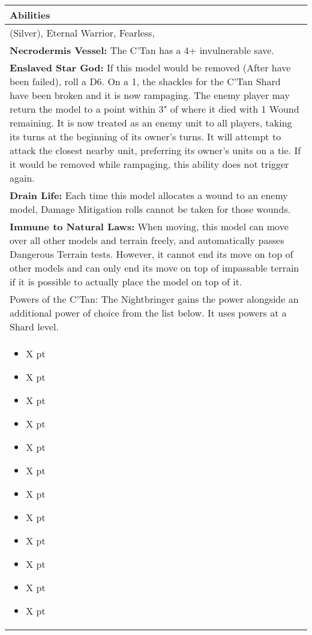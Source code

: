 \noindent
\begin{tabular}{||m{532pt}||}
	\hline
	Abilities \\
	\hline
	\quickref{Awakening Protocols} (Silver), Eternal Warrior, Fearless, \quickref{Reanimation Protocols} \\
	\textbf{Necrodermis Vessel:} The C'Tan has a 4+ invulnerable save. \\
	\textbf{Enslaved Star God:} If this model would be removed (After \quickref{Reanimation Protocols} have been failed), roll a D6. On a 1, the shackles for the C'Tan Shard have been broken and it is now rampaging. The enemy player may return the model to a point within 3" of where it died with 1 Wound remaining. It is now treated as an enemy unit to all players, taking its turns at the beginning of its owner's turns. It will attempt to attack the closest nearby unit, preferring its owner's units on a tie. If it would be removed while rampaging, this ability does not trigger again. \\
	\textbf{Drain Life:} Each time this model allocates a wound to an enemy model, Damage Mitigation rolls cannot be taken for those wounds. \\
	\textbf{Immune to Natural Laws:} When moving, this model can move over all other models and terrain 	freely, and automatically passes Dangerous Terrain tests. However, it cannot end its move on top of other models and can only end its move on top of impassable terrain if it is possible to actually place the model on top of it. \\
	Powers of the C'Tan: The Nightbringer gains the \quickref{Gaze of Death} power alongside an additional power of choice from the list below. It uses powers at a Shard level. \\
	\begin{itemize}
		\item \quickref{Antimatter Meteor} \hrulefill X pt
		\item \quickref{Cosmic Fire} \hrulefill X pt
		\item \quickref{Entropic Touch} \hrulefill X pt
		\item \quickref{Moulder of Worlds} \hrulefill X pt
		\item \quickref{Pyreshards} \hrulefill X pt
		\item \quickref{Sentient Singularity} \hrulefill X pt
		\item \quickref{Seismic Assault} \hrulefill X pt
		\item \quickref{Sky of Falling Stars} \hrulefill X pt
		\item \quickref{Swarm of Spirit Dust} \hrulefill X pt
		\item \quickref{Time's Arrow} \hrulefill X pt
		\item \quickref{Transdimensional Thunderbolt} \hrulefill X pt
		\item \quickref{Withering Worldscape} \hrulefill X pt
	\end{itemize} \\
	\hline
\end{tabular}




